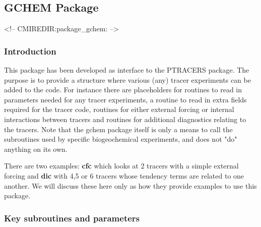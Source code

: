 \subsection {GCHEM Package} 
\label{sec:pkg:gchem}
\begin{rawhtml}
<!-- CMIREDIR:package_gchem: -->
\end{rawhtml}

\subsubsection {Introduction}
This package has been developed as interface to the PTRACERS package.
The purpose is to provide a structure where various (any)
tracer experiments can be added to the code.
For instance there are placeholders for routines
to read in parameters needed for any tracer experiments, a routine
to read in extra fields required for the tracer code, routines
for either external forcing or internal interactions between tracers
and routines for additional diagnostics relating to the tracers.
Note that the gchem package itself is only a means to call
the subroutines used by specific biogeochemical experiments,
and does not "do" anything on its own.

There are two examples: {\bf cfc} which looks at 2 tracers with a
simple external forcing and {\bf dic} with 4,5 or 6 tracers 
whose tendency terms
are related to one another. We will discuss these here only as
how they provide examples to use this package.


\subsubsection {Key subroutines and parameters}

